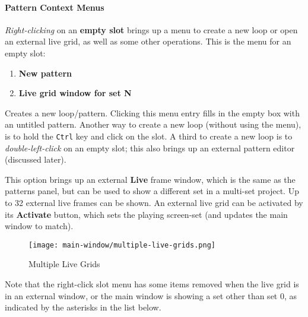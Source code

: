 \paragraph{Pattern Context Menus}
\label{paragraph:patterns_context_menus}

   \textsl{Right-clicking} on an \textbf{empty slot} brings up a menu to create
   a new loop or open an external live grid, as well as some other operations.
   This is the menu for an empty slot:

   \begin{enumerate}
      \item \textbf{New pattern}
      \item \textbf{Live grid window for set N}
   \end{enumerate}

   \setcounter{ItemCounter}{0}      %

   Creates a new loop/pattern.
   Clicking this menu entry fills in the empty box with an untitled
   pattern.
   Another way to create a new loop (without using the menu), is
   to hold the \texttt{Ctrl} key and click on the slot.
   A third to create a new loop is to
   \textsl{double-left-click} on an
   empty slot; this also brings up an external pattern editor (discussed
   later).

   This option brings up an external \textbf{Live} frame window, which
   is the same as the patterns panel, but can be used to show a different set
   in a multi-set project.  Up to 32 external live frames can be shown.
   An external live grid can be activated by its \textbf{Activate} button,
   which sets the playing screen-set
   (and updates the main window to match).


\begin{figure}[H]
   \centering 
   \texttt{[image: main-window/multiple-live-grids.png]}
   \caption{Multiple Live Grids}
   \label{fig:multiple_live_grids}
\end{figure}

   Note that the right-click slot menu has some items removed when the live
   grid is in an external window, or the main window is showing a set other
   than set 0, as indicated by the asterisks in the list below.

